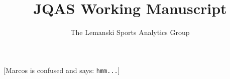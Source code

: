 \documentclass[11pt]{article} %
\title{JQAS Working Manuscript}
\author{The Lemanski Sports Analytics Group}
\newcommand{\marcosc}[1]{[{\color{blue}\sc Marcos is confused and says: {\tt #1}}]}
\begin{document}
\maketitle














\marcosc{hmm...}
\cite{Gelman}







\end{document}
